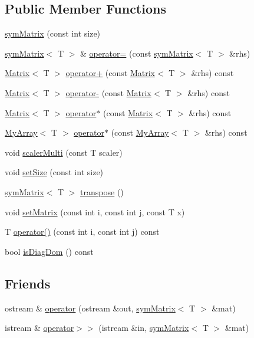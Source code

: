 \subsection*{Public Member Functions}
\begin{DoxyCompactItemize}
\item 
\hyperlink{classsymMatrix_a7ccbe6ae7b25b2705fdf6fce29699d26}{sym\+Matrix} (const int size)
\item 
\hyperlink{classsymMatrix}{sym\+Matrix}$<$ T $>$ \& \hyperlink{classsymMatrix_ae2c26b03d13d63952f6052f88869b2e2}{operator=} (const \hyperlink{classsymMatrix}{sym\+Matrix}$<$ T $>$ \&rhs)
\item 
\hyperlink{classMatrix}{Matrix}$<$ T $>$ \hyperlink{classsymMatrix_a47071a21daf752e9a378c593ef85dbb2}{operator+} (const \hyperlink{classMatrix}{Matrix}$<$ T $>$ \&rhs) const 
\item 
\hyperlink{classMatrix}{Matrix}$<$ T $>$ \hyperlink{classsymMatrix_aaa418f9273ccc5da9d01c645e78ef657}{operator-\/} (const \hyperlink{classMatrix}{Matrix}$<$ T $>$ \&rhs) const 
\item 
\hyperlink{classMatrix}{Matrix}$<$ T $>$ \hyperlink{classsymMatrix_a4c1a9a20ab9bd68aca9f9d35d25e0e36}{operator$\ast$} (const \hyperlink{classMatrix}{Matrix}$<$ T $>$ \&rhs) const 
\item 
\hyperlink{classMyArray}{My\+Array}$<$ T $>$ \hyperlink{classsymMatrix_aa7adbc9378944126e08af6072ff648eb}{operator$\ast$} (const \hyperlink{classMyArray}{My\+Array}$<$ T $>$ \&rhs) const 
\item 
void \hyperlink{classsymMatrix_a75cb07e28a2ef936e45a7e3324429667}{scaler\+Multi} (const T scaler)
\item 
void \hyperlink{classsymMatrix_a06379c2668a6b1fba8b133d753a8f57c}{set\+Size} (const int size)
\item 
\hyperlink{classsymMatrix}{sym\+Matrix}$<$ T $>$ \hyperlink{classsymMatrix_aa3cfa46104ea3a5a6095ab20668a5445}{transpose} ()
\item 
void \hyperlink{classsymMatrix_a28d1f286c0a8572a26441afd635cba51}{set\+Matrix} (const int i, const int j, const T x)
\item 
T \hyperlink{classsymMatrix_a92bbf3194f8bf52559ee19ba706dd15c}{operator()} (const int i, const int j) const 
\item 
bool \hyperlink{classsymMatrix_a43d26e87d92d368544b9bd6384da8121}{is\+Diag\+Dom} () const 
\end{DoxyCompactItemize}
\subsection*{Friends}
\begin{DoxyCompactItemize}
\item 
ostream \& \hyperlink{classsymMatrix_afecf5e9f93f668e75343863ada77a02d}{operator} (ostream \&out, \hyperlink{classsymMatrix}{sym\+Matrix}$<$ T $>$ \&mat)
\item 
istream \& \hyperlink{classsymMatrix_a8a4d48a6277b6f343afee06fcb29ea53}{operator$>$$>$} (istream \&in, \hyperlink{classsymMatrix}{sym\+Matrix}$<$ T $>$ \&mat)
\end{DoxyCompactItemize}
